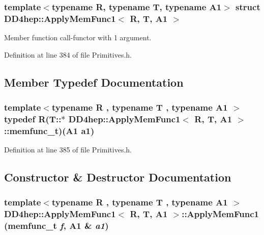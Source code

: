 \subsubsection*{template$<$typename R, typename T, typename A1$>$ struct DD4hep::ApplyMemFunc1$<$ R, T, A1 $>$}

Member function call-\/functor with 1 argument. 

Definition at line 384 of file Primitives.h.

\subsection{Member Typedef Documentation}
\hypertarget{struct_d_d4hep_1_1_apply_mem_func1_a441bb84a015a0f88ef07f25f74f761d1}{
\subsubsection[{memfunc\_\-t}]{\setlength{\rightskip}{0pt plus 5cm}template$<$typename R , typename T , typename A1 $>$ typedef R(T::$\ast$ {\bf DD4hep::ApplyMemFunc1}$<$ R, {\bf T}, A1 $>$::{\bf memfunc\_\-t})(A1 a1)}}
\label{struct_d_d4hep_1_1_apply_mem_func1_a441bb84a015a0f88ef07f25f74f761d1}


Definition at line 385 of file Primitives.h.

\subsection{Constructor \& Destructor Documentation}
\hypertarget{struct_d_d4hep_1_1_apply_mem_func1_aa912c5b5b164fd74df16143aa1b85140}{
\subsubsection[{ApplyMemFunc1}]{\setlength{\rightskip}{0pt plus 5cm}template$<$typename R , typename T , typename A1 $>$ {\bf DD4hep::ApplyMemFunc1}$<$ R, {\bf T}, A1 $>$::{\bf ApplyMemFunc1} ({\bf memfunc\_\-t} {\em f}, \/  A1 \& {\em a1})}}
\label{struct_d_d4hep_1_1_apply_mem_func1_aa912c5b5b164fd74df16143aa1b85140}



